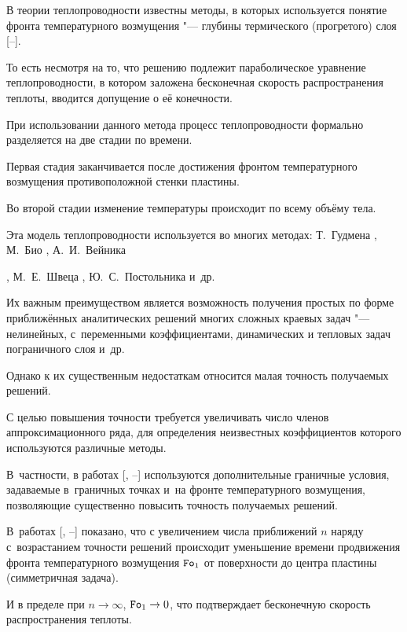 В теории теплопроводности известны методы, в которых используется понятие фронта температурного возмущения "--- глубины термического (прогретого) слоя [--].

То есть несмотря на то, что решению подлежит параболическое уравнение теплопроводности, в котором заложена бесконечная скорость распространения теплоты, вводится допущение о её конечности.

При использовании данного метода процесс теплопроводности формально разделяется на две стадии по времени.

Первая стадия заканчивается после достижения фронтом температурного возмущения противоположной стенки пластины.

Во второй стадии изменение температуры происходит по всему объёму тела.

Эта модель теплопроводности используется во многих методах: Т.~Гудмена \cite{kot:bib3}, М.~Био \cite{kot:bib4}, А.~И.~Вейника 

\cite{kot:bib5}, М.~Е.~Швеца \cite{kot:bib6}, Ю.~С.~Постольника \cite{kot:bib7} и~др.

Их важным преимуществом является возможность получения простых по форме приближённых аналитических решений многих сложных краевых задач "--- нелинейных, с~переменными коэффициентами, динамических и тепловых задач пограничного слоя и~др.

Однако к их существенным недостаткам относится малая точность получаемых решений.

С целью повышения точности требуется увеличивать число членов аппроксимационного ряда, для определения неизвестных коэффициентов которого используются различные методы.

В~частности, в работах [, --] используются дополнительные граничные условия, задаваемые в~граничных точках и~на фронте температурного возмущения, позволяющие существенно повысить точность получаемых решений.



В~работах [, --] показано, что с увеличением числа приближений $n$ наряду с~возрастанием точности решений происходит уменьшение времени продвижения фронта температурного возмущения $\mbox{\tt Fo}_1 $ от поверхности до центра пластины (симметричная задача).

И в пределе при $n \to \infty $, $\mbox{\tt Fo}_1 \to 0$, что подтверждает бесконечную скорость распространения теплоты.

